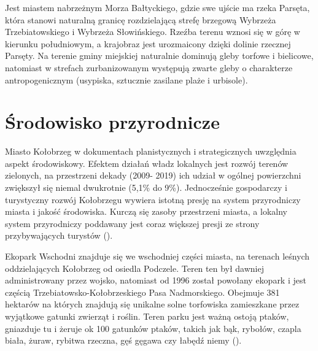 \documentclass{amuthesis}
\begin{document}
Jest miastem nabrzeżnym Morza Bałtyckiego, gdzie swe ujście ma rzeka Parsęta, która stanowi naturalną granicę rozdzielającą strefę brzegową Wybrzeża Trzebiatowskiego i Wybrzeża Słowińskiego.
Rzeźba terenu wznosi się w górę w kierunku południowym, a krajobraz jest urozmaicony dzięki dolinie rzecznej Parsęty.
Na terenie gminy miejskiej naturalnie dominują gleby torfowe i bielicowe, natomiast w strefach zurbanizowanym występują zwarte gleby o charakterze antropogenicznym (usypiska, sztucznie zasilane plaże i urbisole).

\hypertarget{przyr}{%
\section{Środowisko przyrodnicze}\label{przyr}}

Miasto Kołobrzeg w dokumentach planistycznych i strategicznych uwzględnia aspekt środowiskowy.
Efektem działań władz lokalnych jest rozwój terenów zielonych, na przestrzeni dekady (2009- 2019) ich udział w ogólnej powierzchni zwiększył się niemal dwukrotnie (5,1\% do 9\%).
Jednocześnie gospodarczy i turystyczny rozwój Kołobrzegu wywiera istotną presję na
system przyrodniczy miasta i jakość środowiska.
Kurczą się zasoby przestrzeni miasta, a lokalny system przyrodniczy poddawany jest coraz większej presji ze strony przybywających turystów (\textcite{smartcity}).

Ekopark Wschodni znajduje się we wschodniej części miasta, na terenach leśnych oddzielających Kołobrzeg od osiedla Podczele.
Teren ten był dawniej administrowany przez wojsko, natomiast od 1996 został powołany ekopark i jest częścią Trzebiatowsko-Kołobrzeskiego Pasa Nadmorskiego.
Obejmuje 381 hektarów na których znajdują się unikalne solne torfowiska zamieszkane przez wyjątkowe gatunki zwierząt i roślin.
Teren parku jest ważną ostoją ptaków, gniazduje tu i żeruje ok 100 gatunków ptaków, takich jak bąk, rybołów, czapla biała, żuraw, rybitwa rzeczna, gęś gęgawa czy łabędź niemy (\textcite{ekopark}).
\end{document}
